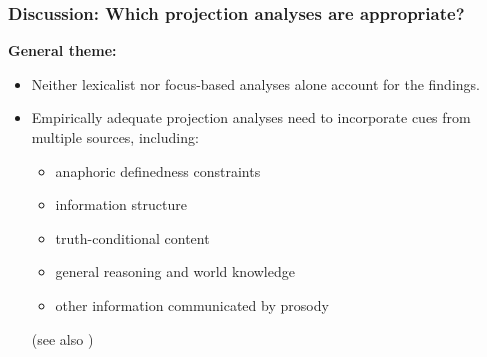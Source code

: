 \documentclass[pdf,xcolor=table,envcountsect,handout]{beamer}
\begin{document}
\begin{frame}
\frametitle{Discussion: Which projection analyses are appropriate?}

\pause

{\bf General theme:} 

\begin{itemize}

\item Neither lexicalist nor focus-based analyses alone account for the findings.

\item Empirically adequate projection analyses need to incorporate cues from multiple sources, including:

\begin{itemize}

\item anaphoric definedness constraints

\item information structure

\item truth-conditional content

\item general reasoning and world knowledge

\item other information communicated by prosody

\end{itemize}

\begin{tiny} (see also \citealt*{tbd-variability}) \end{tiny}

\end{itemize}

\end{frame}
\end{document}
